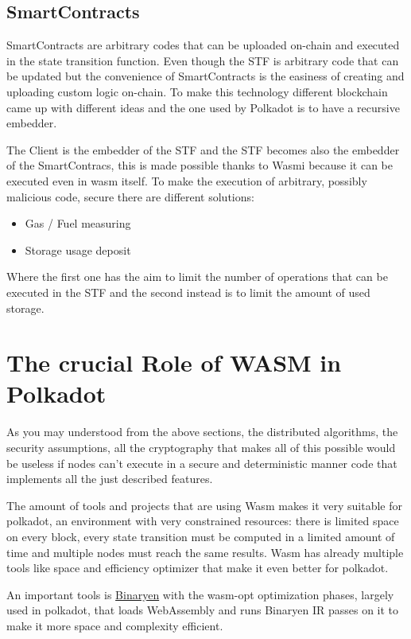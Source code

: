 \subsection{SmartContracts}

SmartContracts are arbitrary codes that can be uploaded on-chain and executed in the state transition function. Even though the STF is arbitrary code that can be updated but the convenience of SmartContracts is the easiness of creating and uploading custom logic on-chain. To make this technology different blockchain came up with different ideas and the one used by Polkadot is to have a recursive embedder.

The Client is the embedder of the STF and the STF becomes also the embedder of the SmartContracs, this is made possible thanks to Wasmi because it can be executed even in wasm itself. To make the execution of arbitrary, possibly malicious code, secure there are different solutions:

\begin{itemize}
  \item Gas / Fuel measuring
  \item Storage usage deposit
\end{itemize}

Where the first one has the aim to limit the number of operations that can be executed in the STF and the second instead is to limit the amount of used storage.

\section{The crucial Role of WASM in Polkadot}

As you may understood from the above sections, the distributed algorithms, the security assumptions, all the cryptography that makes all of this possible would be useless if nodes can't execute in a secure and deterministic manner code that implements all the just described features.

The amount of tools and projects that are using Wasm makes it very suitable for polkadot, an environment with very constrained resources: there is limited space on every block, every state transition must be computed in a limited amount of time and multiple nodes must reach the same results. Wasm has already multiple tools like space and efficiency optimizer that make it even better for polkadot.

An important tools is \href{https://github.com/WebAssembly/binaryen}{Binaryen} with the wasm-opt optimization phases, largely used in polkadot, that loads WebAssembly and runs Binaryen IR passes on it to make it more space and complexity efficient.

